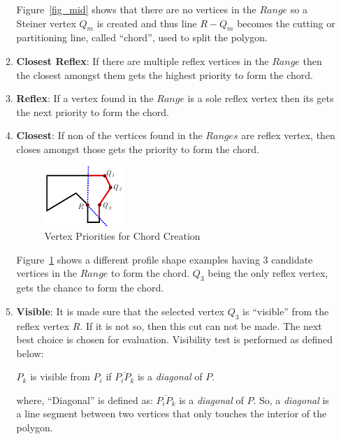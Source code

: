 \begin{enumerate}
\begin{enumerate}

Figure~\ref{fig_mid} shows that there are no vertices in the $Range$ so a Steiner vertex $Q_m$ is created and thus line $R-Q_m$ becomes the cutting or partitioning line, called ``chord'', used to split the polygon.

\item {\bf Closest Reflex}: If there are multiple reflex vertices in the $Range$ then the closest amongst them gets the highest priority to form the chord.

\item {\bf Reflex}: If a vertex found in the $Range$ is a sole reflex vertex then its gets the next priority to form the chord.

\item {\bf Closest}: If non of the vertices found in the $Ranges$ are reflex vertex, then closes amongst those gets the priority to form the chord.


\begin{figure}[h]
\centering \includegraphics[width=0.3\linewidth]{images/polydecomp_choice_1.pdf} 
\caption{Vertex Priorities for Chord Creation}
\label{fig_choice}
\end{figure}


Figure~\ref{fig_choice} shows a different profile shape examples having 3 candidate vertices in the $Range$ to form the chord. $Q_3$ being the only reflex vertex, gets the chance to form the chord.

\item {\bf Visible}: It is made sure that the selected vertex $Q_3$ is ``visible'' from the reflex vertex $R$. If it is not so, then this cut can not be made. The next best choice is chosen for evaluation. Visibility test is performed as defined below:

$P_k$ is visible from $P_i$ if $\overline{P_i P_k}$ is a {\em diagonal} of $P$. 

where, ``Diagonal'' is defined as: $\overline{P_i P_k}$ is a {\em diagonal} of $P$.  So, a {\em diagonal} is a line segment between two vertices that only touches the interior of the polygon.


\end{enumerate}
\end{enumerate}
